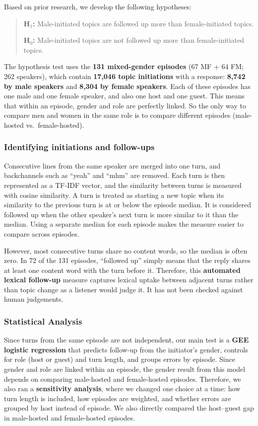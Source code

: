 Based on prior research, we develop the following hypotheses:
\vspace{-0.8em}
\begin{quote}
\textbf{H$_1$:} Male-initiated topics are followed up more than female-initiated topics.

\textbf{H$_0$:} Male-initiated topics are not followed up more than female-initiated topics.
\end{quote}

The hypothesis test uses the \textbf{131 mixed-gender episodes} (67 MF + 64 FM; 262 speakers), which contain \textbf{17,046 topic initiations} with a response: \textbf{8,742 by male speakers} and \textbf{8,304 by female speakers}. Each of these episodes has one male and one female speaker, and also one host and one guest. This means that within an episode, gender and role are perfectly linked. So the only way to compare men and women in the same role is to compare different episodes (male-hosted vs.\ female-hosted).

\subsubsection*{Identifying initiations and follow-ups}
Consecutive lines from the same speaker are merged into one turn, and backchannels such as ``yeah'' and ``mhm'' are removed. Each turn is then represented as a TF-IDF vector, and the similarity between turns is measured with cosine similarity. A turn is treated as starting a new topic when its similarity to the previous turn is at or below the episode median. It is considered followed up when the other speaker's next turn is more similar to it than the median. Using a separate median for each episode makes the measure easier to compare across episodes.

However, most consecutive turns share no content words, so the median is often zero. In 72 of the 131 episodes, ``followed up'' simply means that the reply shares at least one content word with the turn before it. Therefore, this \textbf{automated lexical follow-up} measure captures lexical uptake between adjacent turns rather than topic change as a listener would judge it. It has not been checked against human judgements.

\subsubsection*{Statistical Analysis}
Since turns from the same episode are not independent, our main test is a \textbf{GEE logistic regression} that predicts follow-up from the initiator's gender, controls for role (host or guest) and turn length, and groups errors by episode. Since gender and role are linked within an episode, the gender result from this model depends on comparing male-hosted and female-hosted episodes. Therefore, we also ran a \textbf{sensitivity analysis}, where we changed one choice at a time: how turn length is included, how episodes are weighted, and whether errors are grouped by host instead of episode. We also directly compared the host--guest gap in male-hosted and female-hosted episodes.

